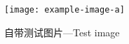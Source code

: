 \begin{figure}
    \centering
    \texttt{[image: example-image-a]}
    \caption{自带测试图片---Test image}\label{F:test-a}
\end{figure}
